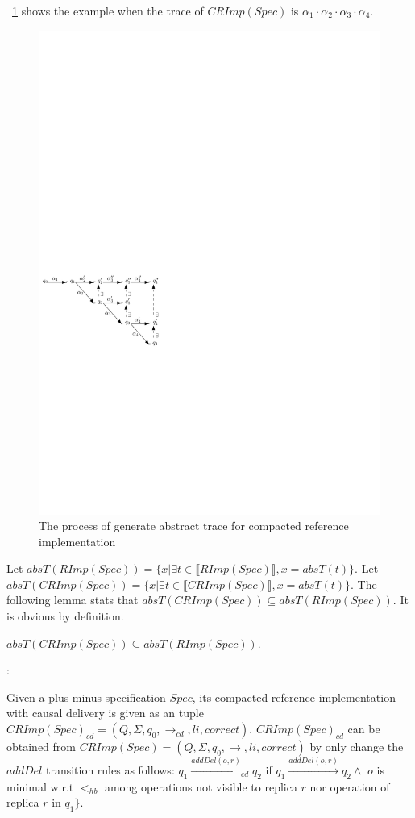 \figurename~\ref{fig:the process of generate abstract trace for compacted reference implementation} shows the example when the trace of $CRImp(Spec)$ is $\alpha_1 \cdot \alpha_2 \cdot \alpha_3 \cdot \alpha_4$.

\begin{figure}[t]
  \centering
  \includegraphics[width=0.4 \textwidth]{figures/PIC-Generate-AbstractTrace-Compact.pdf}
  \caption{The process of generate abstract trace for compacted reference implementation}
  \label{fig:the process of generate abstract trace for compacted reference implementation}
\end{figure}

Let $absT(RImp(Spec)) = \{ x \vert \exists t \in \llbracket RImp(Spec) \rrbracket, x = absT(t) \}$. Let $absT(CRImp(Spec)) = \{ x \vert \exists t \in \llbracket CRImp(Spec) \rrbracket, x = absT(t) \}$. The following lemma stats that $absT(CRImp(Spec)) \subseteq absT(RImp(Spec))$. It is obvious by definition.

\begin{lemma}
\label{lemma:the abstract trace of CRIMPSpec is a subset of the abstract trace of RIMPSpec}
$absT(CRImp(Spec)) \subseteq absT(RImp(Spec))$.
\end{lemma}

:

Given a plus-minus specification $Spec$, its compacted reference implementation with causal delivery is given as an tuple $CRImp(Spec)_{\mathit{cd}} = (Q,\Sigma,q_0,\rightarrow_{\mathit{cd}},li,correct)$. $CRImp(Spec)_{\mathit{cd}}$ can be obtained from $CRImp(Spec) = (Q,\Sigma,q_0,\rightarrow,li,correct)$ by only change the $addDel$  transition rules as follows: $q_1 {\xrightarrow{addDel(o,r)}}_{cd} q_2$ if $q_1 {\xrightarrow{addDel(o,r)}} q_2 \wedge $ $o$ is minimal w.r.t $<_{hb}$ among operations not visible to replica $r$ nor operation of replica $r$ in $q_1 \}$.


